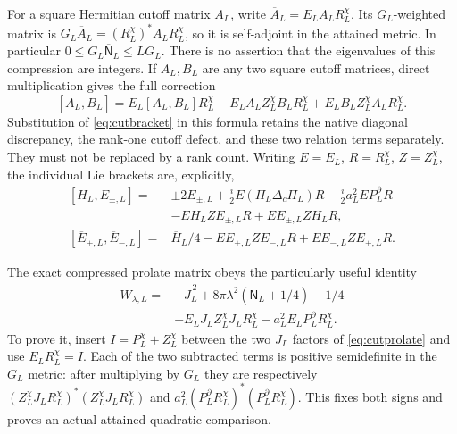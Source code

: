 \documentclass[11pt]{article}
\begin{document}
For a square Hermitian cutoff matrix $A_L$, write
$\overline A_L=E_LA_LR_L^\chi$. Its $G_L$-weighted
matrix is
$G_L\overline A_L=(R_L^\chi)^*A_LR_L^\chi$, so it is
self-adjoint in the attained metric. In particular
$0\leq G_L\overline{\mathsf N}_L\leq L G_L$.
There is no assertion that the eigenvalues of this
compression are integers.
If $A_L,B_L$ are any two square cutoff matrices,
direct multiplication gives the full correction
\begin{equation}\label{eq:compressedbracket}
 [\overline A_L,\overline B_L]
  =E_L[A_L,B_L]R_L^\chi
    -E_LA_LZ_L^\chi B_LR_L^\chi
    +E_LB_LZ_L^\chi A_LR_L^\chi.
\end{equation}
Substitution of \eqref{eq:cutbracket} in this formula
retains the native diagonal discrepancy, the rank-one
cutoff defect, and these two relation terms separately.
They must not be replaced by a rank count.
Writing $E=E_L$, $R=R_L^\chi$, $Z=Z_L^\chi$,
the individual Lie brackets are, explicitly,
\begin{equation}\label{eq:quotientlie}
 \begin{aligned}
 [\overline H_L,\overline E_{\pm,L}]
 ={}&\pm2\overline E_{\pm,L}
   +\tfrac i2E(\Pi_L\Delta_c\Pi_L)R
   -\tfrac i2a_L^2EP_L^\partial R\\
 &-EH_LZE_{\pm,L}R+EE_{\pm,L}ZH_LR,\\
 [\overline E_{+,L},\overline E_{-,L}]
 ={}&\overline H_L/4
       -EE_{+,L}ZE_{-,L}R+EE_{-,L}ZE_{+,L}R .
 \end{aligned}
\end{equation}

The exact compressed prolate matrix obeys the particularly
useful identity
\begin{equation}\label{eq:compressedprolate}
 \begin{split}
 \overline W_{\lambda,L}
 ={}&-\overline J_L^{\,2}
       +8\pi\lambda^2(\overline{\mathsf N}_L+1/4)-1/4\\
 &-E_LJ_LZ_L^\chi J_LR_L^\chi
       -a_L^2E_LP_L^\partial R_L^\chi .
 \end{split}
\end{equation}
To prove it, insert $I=P_L^\chi+Z_L^\chi$
between the two $J_L$ factors of \eqref{eq:cutprolate}
and use $E_LR_L^\chi=I$.
Each of the two subtracted terms is positive
semidefinite in the $G_L$ metric: after multiplying
by $G_L$ they are respectively
$(Z_L^\chi J_LR_L^\chi)^*(Z_L^\chi J_LR_L^\chi)$
and $a_L^2(P_L^\partial R_L^\chi)^*
                           (P_L^\partial R_L^\chi)$.
This fixes both signs and proves an actual attained
quadratic comparison.
\end{document}
